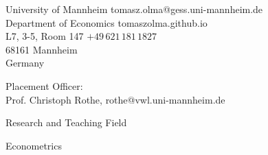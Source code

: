 \documentclass{resume} %
\newcommand{\tab}[1]{\hspace{.2667\textwidth}\rlap{#1}}
\newcommand{\litab}[1]{\hspace{.15\textwidth}\rlap{#1}}
\newcommand{\itab}[1]{\hspace{0em}\rlap{#1}}
\begin{document}

	University of Mannheim \hfill tomasz.olma@gess.uni-mannheim.de \Email \\
	Department of Economics \hfill 	tomaszolma.github.io \Mundus \\
	L7, 3-5, Room 147 \hfill $+49\,621\,181\,1827$ \Telefon\\
	68161 Mannheim\\ 
	Germany

\vspace{5pt}

Placement Officer:\\
Prof. Christoph Rothe, rothe@vwl.uni-mannheim.de 



\begin{rSection}{Research and Teaching Field}
 
Econometrics

\end{rSection}

\end{document}
